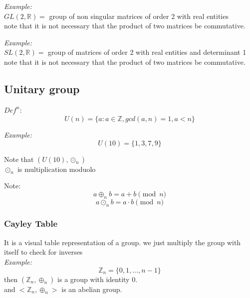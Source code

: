 \documentclass[11pt,letterpaper]{article}
\newenvironment{example}                             
        {\noindent\textit{Example:}\\}
	{}
\newenvironment{definition}
	{\begin{mdframed}$\underline{\textit{Def}^\textit{n}:} $\\}
	{\end{mdframed}}
\begin{document}
\begin{example}
  $GL(2, \mathbb{R}) = $ group of non singular matrices of order 2 with real entities\\ 
  note that it is not necessary that the product of two matrices be commutative.
\end{example}

\begin{example}
  $SL(2, \mathbb{R}) = $ group of matrices of order 2 with real entities and determinant 1\\ 
  note that it is not necessary that the product of two matrices be commutative.
\end{example}

\subsection{Unitary group}

\begin{definition}
\[
  U(n) = \{a:a\in\mathbb{Z}, gcd(a,n) = 1, a < n\}
\]
\end{definition}

\begin{example}
\[
  U(10) = \{1,3,7,9\}
\]

Note that $(U(10), \odot_n)$\\
$\odot_n$ is multiplication moduolo
\end{example}

Note: 
\[
  a \oplus_n b = a + b \pmod n
\]
\[
  a \odot_n b = a \cdot b \pmod n
\]

\subsubsection{Cayley Table}
It is a visual table representation of a group. we just multiply the group with itself to check for inverses\\

\begin{example}
  \[
    \mathbb{Z}_n = \{0,1, \dots, n-1\}
  \]
  then $(\mathbb{Z}_n,\oplus_n)$ is a group with identity 0.\\
  and $<\mathbb{Z}_n, \oplus_n>$ is an abelian group.
\end{example}
\end{document}
